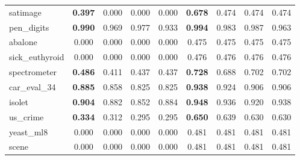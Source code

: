 \begin{figure}[ht]
\begin{tabular}{p{22mm}|*4{p{14mm}}|*4{p{14mm}}}
        satimage&\multicolumn{1}{c}{\textbf{0.397}}&\multicolumn{1}{c}{0.000}&\multicolumn{1}{c}{0.000}&\multicolumn{1}{c|}{0.000}&\multicolumn{1}{c}{\textbf{0.678}}&\multicolumn{1}{c}{0.474}&\multicolumn{1}{c}{0.474}&\multicolumn{1}{c}{0.474}\\
        pen\_digits&\multicolumn{1}{c}{\textbf{0.990}}&\multicolumn{1}{c}{0.969}&\multicolumn{1}{c}{0.977}&\multicolumn{1}{c|}{0.933}&\multicolumn{1}{c}{\textbf{0.994}}&\multicolumn{1}{c}{0.983}&\multicolumn{1}{c}{0.987}&\multicolumn{1}{c}{0.963}\\
        abalone&\multicolumn{1}{c}{0.000}&\multicolumn{1}{c}{0.000}&\multicolumn{1}{c}{0.000}&\multicolumn{1}{c|}{0.000}&\multicolumn{1}{c}{0.475}&\multicolumn{1}{c}{0.475}&\multicolumn{1}{c}{0.475}&\multicolumn{1}{c}{0.475}\\
        sick\_euthyroid&\multicolumn{1}{c}{0.000}&\multicolumn{1}{c}{0.000}&\multicolumn{1}{c}{0.000}&\multicolumn{1}{c|}{0.000}&\multicolumn{1}{c}{0.476}&\multicolumn{1}{c}{0.476}&\multicolumn{1}{c}{0.476}&\multicolumn{1}{c}{0.476}\\
        spectrometer&\multicolumn{1}{c}{\textbf{0.486}}&\multicolumn{1}{c}{0.411}&\multicolumn{1}{c}{0.437}&\multicolumn{1}{c|}{0.437}&\multicolumn{1}{c}{\textbf{0.728}}&\multicolumn{1}{c}{0.688}&\multicolumn{1}{c}{0.702}&\multicolumn{1}{c}{0.702}\\
        car\_eval\_34&\multicolumn{1}{c}{\textbf{0.885}}&\multicolumn{1}{c}{0.858}&\multicolumn{1}{c}{0.825}&\multicolumn{1}{c|}{0.825}&\multicolumn{1}{c}{\textbf{0.938}}&\multicolumn{1}{c}{0.924}&\multicolumn{1}{c}{0.906}&\multicolumn{1}{c}{0.906}\\
        isolet&\multicolumn{1}{c}{\textbf{0.904}}&\multicolumn{1}{c}{0.882}&\multicolumn{1}{c}{0.852}&\multicolumn{1}{c|}{0.884}&\multicolumn{1}{c}{\textbf{0.948}}&\multicolumn{1}{c}{0.936}&\multicolumn{1}{c}{0.920}&\multicolumn{1}{c}{0.938}\\
        us\_crime&\multicolumn{1}{c}{\textbf{0.334}}&\multicolumn{1}{c}{0.312}&\multicolumn{1}{c}{0.295}&\multicolumn{1}{c|}{0.295}&\multicolumn{1}{c}{\textbf{0.650}}&\multicolumn{1}{c}{0.639}&\multicolumn{1}{c}{0.630}&\multicolumn{1}{c}{0.630}\\
        yeast\_ml8&\multicolumn{1}{c}{0.000}&\multicolumn{1}{c}{0.000}&\multicolumn{1}{c}{0.000}&\multicolumn{1}{c|}{0.000}&\multicolumn{1}{c}{0.481}&\multicolumn{1}{c}{0.481}&\multicolumn{1}{c}{0.481}&\multicolumn{1}{c}{0.481}\\
        scene&\multicolumn{1}{c}{0.000}&\multicolumn{1}{c}{0.000}&\multicolumn{1}{c}{0.000}&\multicolumn{1}{c|}{0.000}&\multicolumn{1}{c}{0.481}&\multicolumn{1}{c}{0.481}&\multicolumn{1}{c}{0.481}&\multicolumn{1}{c}{0.481}\\

\end{tabular}
\end{figure}
